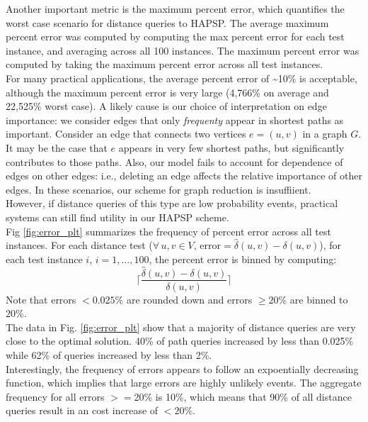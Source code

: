 \documentclass[10.5pt,journal]{IEEEtran}
\begin{document}
		Another important metric is the maximum percent error, which quantifies the worst case scenario
		for distance queries to HAPSP. The average maximum percent error was computed by computing the
		max percent error for each test instance, and averaging across all 100 instances. The maximum
		percent error was computed by taking the maximum percent error across all test instances. \\
		
		For many practical applications, the average percent error of \textasciitilde10\% is acceptable,
		although the maximum percent error is very large (4,766\% on average and 22,525\% worst case).
		A likely cause is our choice of interpretation on edge importance: we consider edges that only
		{\it{frequenty}} appear in shortest paths as important. Consider an edge that connects two
		vertices $e=(u,v)$ in a graph $G$. It may be the case that $e$ appears in very few shortest paths,
		but significantly contributes to those paths. Also, our model fails to account for dependence of
		edges on other edges: i.e., deleting an edge affects the relative importance of other edges.
		In these scenarios, our scheme for graph reduction is insuffiient. \\
		
		However, if distance queries of this type are low probability events, practical systems can
		still find utility in our HAPSP scheme. \\
		
		Fig \ref{fig:error_plt} summarizes the frequency of percent error across all test instances. 
		For each distance test ($\forall\, u,v\in V,\,\mbox{error} = \hat{\delta}(u,v) - \delta(u,v)$),
		for each test instance $i$, $i = 1,...,100$, the percent error is binned by computing:
			\[\lceil\frac{\hat{\delta}(u,v) - \delta(u,v)}{ \delta(u,v)}\rceil\]
		Note that errors $< 0.025\%$ are rounded down and errors $\ge 20\%$ are binned to $20\%$.\\
		
		The data in Fig. \ref{fig:error_plt} show that a majority of distance queries are very close
		to the optimal solution. 40\% of path queries increased by less than 0.025\% while 62\% of
		queries increased by less than 2\%. \\
		
		Interestingly, the frequency of errors appears to follow an expoentially decreasing function,
		which implies that large errors are highly unlikely events. The aggregate frequency for all
		errors $>=$20\% is 10\%, which means that 90\% of all distance queries result in an cost
		increase of $<20\%$.
	
\end{document}
